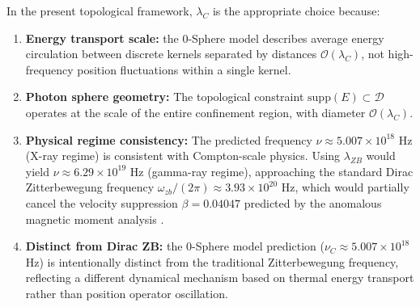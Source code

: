 \documentclass[%
 reprint,
 amsmath,amssymb,
 aps,
 prb,
]{revtex4-2}
\numberwithin{equation}{section}
\begin{document}
In the present topological framework, $\lambda_C$ is the appropriate choice because:

\begin{enumerate}
\item \textbf{Energy transport scale:} the 0-Sphere model describes average energy circulation between discrete kernels separated by distances $\mathcal{O}(\lambda_C)$, not high-frequency position fluctuations within a single kernel.

\item \textbf{Photon sphere geometry:} The topological constraint $\mathrm{supp}(E) \subset \mathcal{D}$ operates at the scale of the entire confinement region, with diameter $\mathcal{O}(\lambda_C)$.

\item \textbf{Physical regime consistency:} The predicted frequency $\nu \approx 5.007 \times 10^{18}$ Hz (X-ray regime) is consistent with Compton-scale physics. Using $\lambda_{ZB}$ would yield $\nu \approx 6.29 \times 10^{19}$ Hz (gamma-ray regime), approaching the standard Dirac Zitterbewegung frequency $\omega_{zb}/(2\pi) \approx 3.93 \times 10^{20}$ Hz, which would partially cancel the velocity suppression $\beta = 0.04047$ predicted by the anomalous magnetic moment analysis \cite{hanamura17764997}.

\item \textbf{Distinct from Dirac ZB:} the 0-Sphere model prediction ($\nu_C \approx 5.007 \times 10^{18}$ Hz) is intentionally distinct from the traditional Zitterbewegung frequency, reflecting a different dynamical mechanism based on thermal energy transport rather than position operator oscillation.
\end{enumerate}
\end{document}
